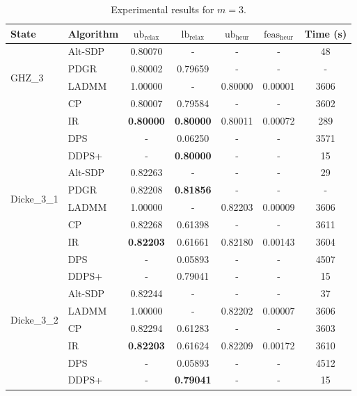 \documentclass[smallextended]{svjour3}
\newcommand{\1}{\mathbf{1}}
\newcommand{\heur}{\text{heur}}
\newcommand{\relx}{\text{relax}}
\newcommand{\lb}{\text{lb}}
\newcommand{\ub}{\text{ub}}
\newcommand{\feas}{\text{feas}}
\begin{document}
\begin{table}[htb]
\centering
\begin{tabular}{l|l|ccccc}
\toprule
    \textbf{State} & \textbf{Algorithm} & $\ub_{\relx}$ & $\lb_{\relx}$ & $\ub_{\heur}$ & $\feas_{\heur}$ & \textbf{Time (s)} \\
\toprule
 \multirow{4}{*}{GHZ\_3}
& Alt-SDP & 0.80070 & - & - & - & 48 \\
& PDGR & 0.80002  & 0.79659 & - & - & - \\
 & LADMM & 1.00000 & - & 0.80000 & 0.00001 & 3606 \\
 & CP & 0.80007 & 0.79584 & - & - & 3602 \\
 & IR & \textbf{0.80000} & \textbf{0.80000} & 0.80011 & 0.00072 & 289 \\
 & DPS & - & 0.06250 & - & - & 3571 \\
  & DDPS+ & - & \textbf{0.80000} & - & - & 15 \\

\midrule
 \multirow{4}{*}{Dicke\_3\_1}
& Alt-SDP & 0.82263 & - & - & - & 29 \\
& PDGR &  0.82208 & \textbf{0.81856} & - & - & - \\
 & LADMM & 1.00000 & - & 0.82203 & 0.00009 & 3606 \\
 & CP & 0.82268 & 0.61398 & - & - & 3611 \\
 & IR & \textbf{0.82203} & 0.61661 & 0.82180 & 0.00143 & 3604 \\
 & DPS & - & 0.05893 & - & - & 4507 \\
 & DDPS+ & - & 0.79041 & - & - & 15 \\

\midrule
 \multirow{4}{*}{Dicke\_3\_2}
& Alt-SDP & 0.82244 & - & - & - & 37 \\
 & LADMM & 1.00000 & - & 0.82202 & 0.00007 & 3606 \\
 & CP & 0.82294 & 0.61283 & - & - & 3603 \\
 & IR & \textbf{0.82203} & 0.61624 & 0.82209 & 0.00172 & 3610 \\
 & DPS & - & 0.05893 & - & - & 4512 \\
  & DDPS+ & - & \textbf{0.79041} & - & - & 15 \\
\bottomrule


\end{tabular}
\caption{Experimental results for $m=3$.}
\label{tab.m3}
\end{table}
\end{document}
